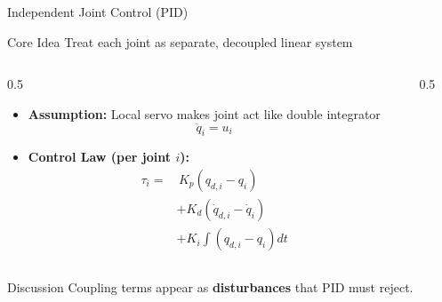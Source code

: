 \documentclass[10pt]{beamer}
\begin{document}
\begin{frame}{Independent Joint Control (PID)}
    \begin{block}{Core Idea}
        Treat each joint as separate, decoupled linear system
    \end{block}
    
    \begin{columns}
        \begin{column}{0.5\textwidth}
            \begin{itemize}
                \item \textbf{Assumption:} Local servo makes joint act like double integrator
                \[
                \ddot{q}_i = u_i
                \]
                \item \textbf{Control Law (per joint $i$):}
                \begin{align*}
                \tau_i =& \,K_p (q_{d,i} - q_i) \\
                      &+ K_d (\dot{q}_{d,i} - \dot{q}_i) \\
                      &+ K_i \int (q_{d,i} - q_i) dt
                \end{align*}
            \end{itemize}
        \end{column}
        
        \begin{column}{0.5\textwidth}
            \begin{center}
            \end{center}
        \end{column}
    \end{columns}
    
    \vspace{3mm}
    \begin{alertblock}{Discussion}
        Coupling terms appear as \textbf{disturbances} that PID must reject.
    \end{alertblock}
\end{frame}
\end{document}
